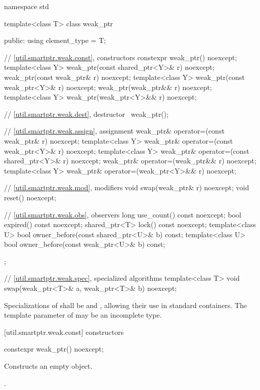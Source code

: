 \begin{codeblock}
namespace std {
  template<class T> class weak_ptr {
  public:
    using element_type = T;

    // \ref{util.smartptr.weak.const}, constructors
    constexpr weak_ptr() noexcept;
    template<class Y> weak_ptr(const shared_ptr<Y>& r) noexcept;
    weak_ptr(const weak_ptr& r) noexcept;
    template<class Y> weak_ptr(const weak_ptr<Y>& r) noexcept;
    weak_ptr(weak_ptr&& r) noexcept;
    template<class Y> weak_ptr(weak_ptr<Y>&& r) noexcept;

    // \ref{util.smartptr.weak.dest}, destructor
    ~weak_ptr();

    // \ref{util.smartptr.weak.assign}, assignment
    weak_ptr& operator=(const weak_ptr& r) noexcept;
    template<class Y> weak_ptr& operator=(const weak_ptr<Y>& r) noexcept;
    template<class Y> weak_ptr& operator=(const shared_ptr<Y>& r) noexcept;
    weak_ptr& operator=(weak_ptr&& r) noexcept;
    template<class Y> weak_ptr& operator=(weak_ptr<Y>&& r) noexcept;

    // \ref{util.smartptr.weak.mod}, modifiers
    void swap(weak_ptr& r) noexcept;
    void reset() noexcept;

    // \ref{util.smartptr.weak.obs}, observers
    long use_count() const noexcept;
    bool expired() const noexcept;
    shared_ptr<T> lock() const noexcept;
    template<class U> bool owner_before(const shared_ptr<U>& b) const;
    template<class U> bool owner_before(const weak_ptr<U>& b) const;
  };

  // \ref{util.smartptr.weak.spec}, specialized algorithms
  template<class T> void swap(weak_ptr<T>& a, weak_ptr<T>& b) noexcept;
}
\end{codeblock}

\pnum
Specializations of  shall be  and
, allowing their use in standard
containers.  The template parameter  of  may be an
incomplete type.

[util.smartptr.weak.const]{ constructors}

%
\begin{itemdecl}
constexpr weak_ptr() noexcept;
\end{itemdecl}

\begin{itemdescr}
\pnum\effects  Constructs an empty  object.

\pnum\postconditions  {}.
\end{itemdescr}

